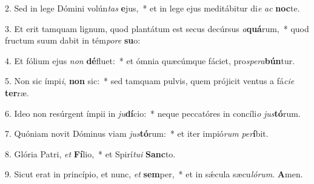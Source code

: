 2. Sed in lege Dómini volún\textit{tas} \textbf{e}jus,~*  et in lege ejus meditábitur di\textit{e} \textit{ac} \textbf{noc}te.\

3. Et erit tamquam lignum, quod plantátum est secus decúrsus \textit{a}\textbf{quá}rum,~*  quod fructum suum dabit in tém\textit{po}\textit{re} \textbf{su}o:\

4. Et fólium ejus \textit{non} \textbf{dé}fluet:~*  et ómnia quæcúmque fáciet, pro\textit{spe}\textit{ra}\textbf{bún}tur.\

5. Non sic ímpi\textit{i}, \textbf{non} sic:~*  sed tamquam pulvis, quem prójicit ventus a fá\textit{ci}\textit{e} \textbf{ter}ræ.\

6. Ideo non resúrgent ímpii in \textit{ju}\textbf{dí}cio:~*  neque peccatóres in concíli\textit{o} \textit{jus}\textbf{tó}rum.\

7. Quóniam novit Dóminus viam \textit{jus}\textbf{tó}rum:~*  et iter impió\textit{rum} \textit{per}\textbf{í}bit.\

8. Glória Patri, \textit{et} \textbf{Fí}lio,~*  et Spirí\textit{tu}\textit{i} \textbf{Sanc}to.\

9. Sicut erat in princípio, et nunc, \textit{et} \textbf{sem}per,~*  et in sǽcula sæcu\textit{ló}\textit{rum}. \textbf{A}men.\

